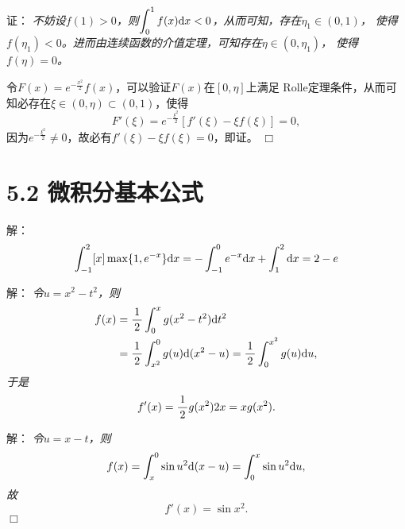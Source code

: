 \begin{frame}
	\linespread{1.5}
	\pause
	
	\bigskip
	
	\small 证：\it 
	不妨设$f(1)>0$，则$\displaystyle\int_0^1f(x)\mathrm{d} x<0$，从而可知，存在$\eta_1\in(0,1)$，
	使得$f(\eta_1)<0$。进而由连续函数的介值定理，可知存在$\eta\in(0,\eta_1)$，
	使得$f(\eta)=0$。
	
	令$F(x)=e^{-\frac{x^2}2}f(x)$，可以验证$F(x)$在$[0,\eta]$上满足
	Rolle定理条件，从而可知必存在$\xi\in(0,\eta)\subset(0,1)$，使得
	$$F'(\xi)=e^{-\frac{\xi^2}2}[f'(\xi)-\xi f(\xi)]=0,$$
	因为$e^{-\frac{\xi^2}2}\ne0$，故必有$f'(\xi)-\xi f(\xi)=0$，即证。
	\hfill$\Box$
\end{frame}

\section{5.2 微积分基本公式}

\begin{frame}
	\linespread{1.5}
	
	\pause
	\small 解：\it 
	$$
		\displaystyle\int_{-1}^2[x]\max\{1,e^{-x}\}\mathrm{d} x
		=-\displaystyle\int_{-1}^0e^{-x}\mathrm{d} x+\displaystyle\int_1^2\mathrm{d} x
		=2-e
	$$
\end{frame}

\begin{frame}
	\linespread{1.5}
	
	\pause
	\small 解：\it 
	令$u=x^2-t^2$，则
	\begin{align*}
		f(x)&=\displaystyle\frac{\,{1}\,}{\,{2}\,}\displaystyle\int_0^xg(x^2-t^2)\mathrm{d} t^2\\
		&=\displaystyle\frac{\,{1}\,}{\,{2}\,}\displaystyle\int_{x^2}^0g(u)\mathrm{d}(x^2-u)
		=\displaystyle\frac{\,{1}\,}{\,{2}\,}\displaystyle\int_0^{x^2}g(u)\mathrm{d} u,
	\end{align*}
	于是
	$$f'(x)=\displaystyle\frac{\,{1}\,}{\,{2}\,}g(x^2)2x=xg(x^2).$$
\end{frame}

\begin{frame}
	\linespread{1.5}
	
	\pause
	\small 解：\it 
	令$u=x-t$，则
	$$f(x)=\displaystyle\int_x^0\sin u^2\mathrm{d}(x-u)=\displaystyle\int_0^x\sin u^2\mathrm{d} u,$$
	故
	$$f'(x)=\sin x^2.$$
	\hfill$\Box$
\end{frame}

